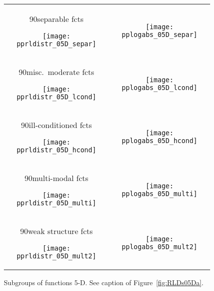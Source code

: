\documentclass{article}
\newcommand{\rot}[2][2.5]{
  \hspace*{-3.5\baselineskip}%
  \begin{rotate}{90}\hspace{#1em}#2
  \end{rotate}}
\begin{document}
\begin{figure}[htbp!]
\centering
\begin{tabular}{@{}c@{}c@{}}
\rot[2.5]{separable fcts}
\texttt{[image: pprldistr\_05D\_separ]} &
\texttt{[image: pplogabs\_05D\_separ]}
\\[-1ex]
\rot[1.3]{misc.\ moderate fcts}
\texttt{[image: pprldistr\_05D\_lcond]} &
\texttt{[image: pplogabs\_05D\_lcond]}
\\[-1ex]
\rot[1.1]{ill-conditioned fcts}
\texttt{[image: pprldistr\_05D\_hcond]} &
\texttt{[image: pplogabs\_05D\_hcond]}
\\[-1ex]
\rot[1.7]{multi-modal fcts}
\texttt{[image: pprldistr\_05D\_multi]} &
\texttt{[image: pplogabs\_05D\_multi]}
\\[-1ex]
\rot[1.5]{weak structure fcts}
\texttt{[image: pprldistr\_05D\_mult2]} &
\texttt{[image: pplogabs\_05D\_mult2]}
\end{tabular}
\vspace*{-0.5ex}
\caption{\label{fig:RLDs05Db}Subgroups of functions 5-D. See caption of Figure~\ref{fig:RLDs05Da}.}
\end{figure}
\end{document}
